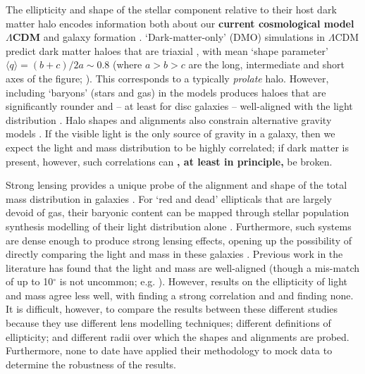 \documentclass[useAMS,usenatbib]{mn2e}
\newcommand{\cb}[1]{{\color{red} \textbf{#1}}}
\begin{document}
The ellipticity and shape of the stellar component relative to their host dark matter halo encodes information both about our \cb{current cosmological model $\Lambda$CDM} and galaxy formation \citep[e.g.][]{1994ApJ...431..617D,2001ApJ...551..294I,2004ApJ...611L..73K,2007MNRAS.378...55M,2007arXiv0707.0737D,2012MNRAS.424L..16L,2014JPhG...41f3101R}. `Dark-matter-only' (DMO) simulations in $\Lambda$CDM predict dark matter haloes that are triaxial \citep{1991ApJ...378..496D,1992ApJ...399..405W,1996ApJ...462..563N,2002ApJ...574..538J}, with mean `shape parameter' $\langle q \rangle = (b+c)/2a \sim 0.8$ (where $a > b > c$ are the long, intermediate and short axes of the figure; \citealt{2007MNRAS.378...55M}). This corresponds to a typically {\it prolate} halo. However, including `baryons' (stars and gas) in the models produces haloes that are significantly rounder and -- at least for disc galaxies -- well-aligned with the light distribution \citep{1991ApJ...377..365K,1994ApJ...431..617D,2007arXiv0707.0737D}. Halo shapes and alignments also constrain alternative gravity models \citep{2001MNRAS.327..552M,2004ApJ...610L..97H,2005MNRAS.361..971R,2012PhRvD..86h3507F,2013MNRAS.434.2971D}. If the visible light is the only source of gravity in a galaxy, then we expect the light and mass distribution to be highly correlated; if dark matter is present, however, such correlations can\cb{, at least in principle,} be broken.

Strong lensing provides a unique probe of the alignment and shape of the total mass distribution in galaxies \citep[e.g.][]{1986ApJ...310..568B,1992grle.book.....S,1998ApJ...509..561K,2000ApJ...543..131K,2006ApJ...649..599K,2007AJ....134..668A,2008MNRAS.383..857F,2010ApJ...724..511A,2012MNRAS.424..104L}. For `red and dead' ellipticals that are largely devoid of gas, their baryonic content can be mapped through stellar population synthesis modelling of their light distribution alone \citep[e.g.][]{2005ApJ...623L...5F,2006ApJ...640..662T,2008MNRAS.383..857F}. Furthermore, such systems are dense enough to produce strong lensing effects, opening up the possibility of directly comparing the light and mass in these galaxies \citep{1998ApJ...509..561K,2008MNRAS.383..857F,2009ApJ...690..670T,2012A&A...538A..99S}. Previous work in the literature has found that the light and mass are well-aligned (though a mis-match of up to 10$^\circ$ is not uncommon; e.g. \citealt{2012A&A...538A..99S}). However, results on the ellipticity of light and mass agree less well, with \citet{2012A&A...538A..99S} finding a strong correlation and \citet{1998ApJ...509..561K} and \citet{2008MNRAS.383..857F} finding none. It is difficult, however, to compare the results between these different studies because they use different lens modelling techniques; different definitions of ellipticity; and different radii over which the shapes and alignments are probed. Furthermore, none to date have applied their methodology to mock data to determine the robustness of the results.
\end{document}

